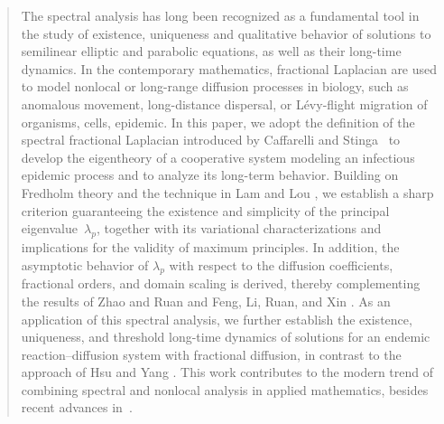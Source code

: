 \documentclass[a4paper,11pt]{amsart}
\theoremstyle{definition}
\numberwithin{equation}{section}
\theoremstyle{definition}
\begin{document}
\begin{abstract} The spectral analysis has long been recognized as a fundamental tool in the study of existence, uniqueness and qualitative behavior of solutions to semilinear elliptic and parabolic equations, as well as their long-time dynamics. In the contemporary mathematics, fractional Laplacian are used to model  nonlocal or long-range diffusion processes in biology, such as anomalous movement, long-distance dispersal, or Lévy-flight migration of organisms, cells, epidemic. In this paper, we adopt the definition of the spectral fractional Laplacian introduced by Caffarelli and Stinga~\cite{caffarelli_fractional_2016} to develop the eigentheory of a cooperative system modeling an infectious epidemic process and to analyze its long-term behavior. Building on Fredholm theory and the technique in Lam and Lou \cite{lam_ays_2016}, we establish a sharp criterion guaranteeing the existence and simplicity of the principal eigenvalue~$\lambda_p$, together with its variational characterizations and implications for the validity of maximum principles. In addition, the asymptotic behavior of $\lambda_p$ with respect to the diffusion coefficients, fractional orders, and domain scaling is derived, thereby complementing the results of Zhao and Ruan \cite{zhao_spatiotemporal_2023} and Feng, Li, Ruan, and Xin \cite{feng_principal_2024}. As an application of this spectral analysis, we further establish the existence, uniqueness, and threshold long-time dynamics of solutions for an endemic reaction–diffusion system with fractional diffusion, in contrast to the approach of Hsu and Yang \cite{hsu_existence_2013}. This work contributes to the modern trend of combining spectral and nonlocal analysis in applied mathematics, besides recent advances in~\cite{benguria_hadamard_2024,bisterzo_siclari_2025,ognibene_2025,zhao_spatiotemporal_2023,feng_principal_2024,feng_asymptotic_2025,nguyen_dynamics_2022}.







\end{abstract}





\end{document}
